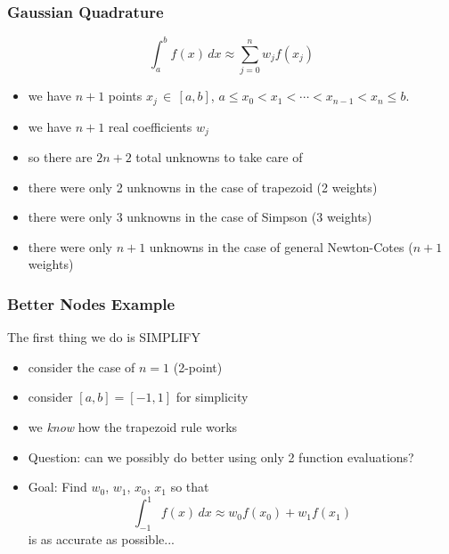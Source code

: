 \documentclass[10pt]{beamer}
\begin{document}
\begin{frame}
\frametitle{Gaussian Quadrature}
    \begin{equation*}
    \int_a^b f(x)\,dx \approx \sum_{j=0}^n w_j f(x_j)
    \end{equation*}
  \begin{itemize}
    \item we have $n+1$ points $x_j \,\in\,[a,b]$, $a\le x_0<x_1<\cdots<x_{n-1}<x_n\le b$.
    \item we have $n+1$ real coefficients $w_j$
\vspace{0.5cm}

    \item so there are $2n+2$ total unknowns to take care of
\vspace{0.5cm}

    \item there were only 2 unknowns in the case of trapezoid (2 weights)
    \item there were only 3 unknowns in the case of Simpson (3 weights)
    \item there were only $n+1$ unknowns in the case of general Newton-Cotes
($n+1$ weights)
  \end{itemize}
\end{frame}
\begin{frame}
\frametitle{Better Nodes Example}
The first thing we do is SIMPLIFY
  \begin{itemize}
    \item consider the case of $n=1$ (2-point)
    \item consider $[a,b] = [-1,1]$ for simplicity
    \item we \emph{know} how the trapezoid rule works
    \item Question: can we possibly do better using only 2 function evaluations?
    \item Goal: Find $w_0$, $w_1$, $x_0$, $x_1$ so that
    \begin{equation*}
      \int_{-1}^{1} f(x)\, dx \approx w_0 f(x_0) + w_1 f(x_1)
    \end{equation*}
    is as accurate as possible...
  \end{itemize}
\end{frame}
\end{document}
